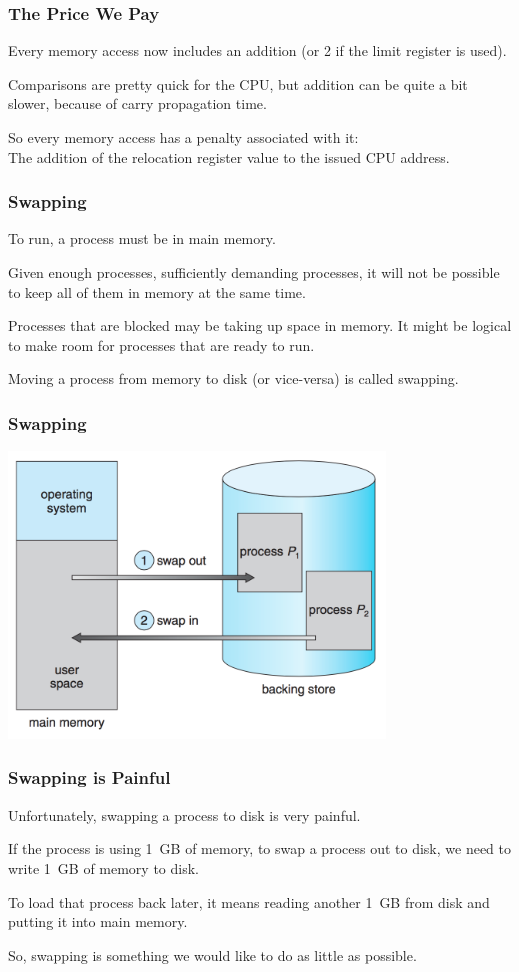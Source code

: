 \begin{frame}
\frametitle{The Price We Pay}

Every memory access now includes an addition (or 2 if the limit register is used). 

Comparisons are pretty quick for the CPU, but addition can be quite a bit slower, because of carry propagation time.

So every memory access has a penalty associated with it: \\
\quad The addition of the relocation register value to the issued CPU address.

\end{frame}

\begin{frame}
\frametitle{Swapping}


To run, a process must be in main memory. 

Given enough processes, sufficiently demanding processes, it will not be possible to keep all of them in memory at the same time. 

Processes that are blocked may be taking up space in memory. It might be logical to make room for processes that are ready to run.

Moving a process from memory to disk (or vice-versa) is called \alert{swapping}.

\end{frame}

\begin{frame}
\frametitle{Swapping}
\begin{center}
\includegraphics[width=0.75\textwidth]{images/swapping1.png}
\end{center}


\end{frame}

\begin{frame}
\frametitle{Swapping is Painful}

Unfortunately, swapping a process to disk is very painful. 

If the process is using 1~GB of memory, to swap a process out to disk, we need to write 1~GB of memory to disk. 

To load that process back later, it means reading another 1~GB from disk and putting it into main memory.
 
So, swapping is something we would like to do as little as possible.

\end{frame}

